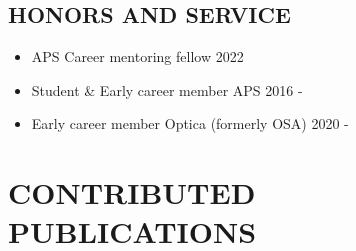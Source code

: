 \documentclass[margin]{res} %
\begin{document}
\begin{resume}
\section{HONORS AND SERVICE}
 
\begin{itemize}
    \item{APS Career mentoring fellow \hfill 2022}
    \item{Student \& Early career member APS \hfill 2016 -}
    \item{Early career member Optica (formerly OSA) \hfill 2020 -}
\end{itemize}

\end{resume}

\section{CONTRIBUTED PUBLICATIONS}

\nocite{*}

\printbibliography[heading=none, keyword={peer}]



\end{document}

